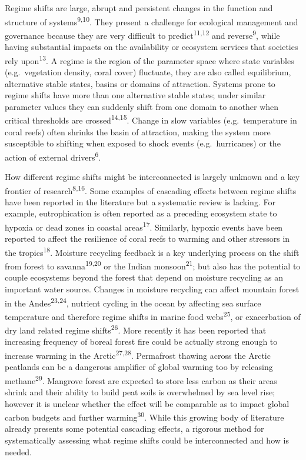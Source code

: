 \documentclass[9pt,]{article}
\begin{document}
Regime shifts are large, abrupt and persistent changes in the function
and structure of systems\textsuperscript{9,10}. They present a challenge
for ecological management and governance because they are very difficult
to predict\textsuperscript{11,12} and reverse\textsuperscript{9}, while
having substantial impacts on the availability or ecosystem services
that societies rely upon\textsuperscript{13}. A regime is the region of
the parameter space where state variables (e.g.~vegetation density,
coral cover) fluctuate, they are also called equilibrium, alternative
stable states, basins or domains of attraction. Systems prone to regime
shifts have more than one alternative stable states; under similar
parameter values they can suddenly shift from one domain to another when
critical thresholds are crossed\textsuperscript{14,15}. Change in slow
variables (e.g.~temperature in coral reefs) often shrinks the basin of
attraction, making the system more susceptible to shifting when exposed
to shock events (e.g.~hurricanes) or the action of external
drivers\textsuperscript{6}.

How different regime shifts might be interconnected is largely unknown
and a key frontier of research\textsuperscript{8,16}. Some examples of
cascading effects between regime shifts have been reported in the
literature but a systematic review is lacking. For example,
eutrophication is often reported as a preceding ecosystem state to
hypoxia or dead zones in coastal areas\textsuperscript{17}. Similarly,
hypoxic events have been reported to affect the resilience of coral
reefs to warming and other stressors in the tropics\textsuperscript{18}.
Moisture recycling feedback is a key underlying process on the shift
from forest to savanna\textsuperscript{19,20} or the Indian
monsoon\textsuperscript{21}; but also has the potential to couple
ecosystems beyond the forest that depend on moisture recycling as an
important water source. Changes in moisture recycling can affect
mountain forest in the Andes\textsuperscript{23,24}, nutrient cycling in
the ocean by affecting sea surface temperature and therefore regime
shifts in marine food webs\textsuperscript{25}, or exacerbation of dry
land related regime shifts\textsuperscript{26}. More recently it has
been reported that increasing frequency of boreal forest fire could be
actually strong enough to increase warming in the
Arctic\textsuperscript{27,28}. Permafrost thawing across the Arctic
peatlands can be a dangerous amplifier of global warming too by
releasing methane\textsuperscript{29}. Mangrove forest are expected to
store less carbon as their areas shrink and their ability to build peat
soils is overwhelmed by sea level rise; however it is unclear whether
the effect will be comparable as to impact global carbon budgets and
further warming\textsuperscript{30}. While this growing body of
literature already presents some potential cascading effects, a rigorous
method for systematically assessing what regime shifts could be
interconnected and how is needed.
\end{document}
